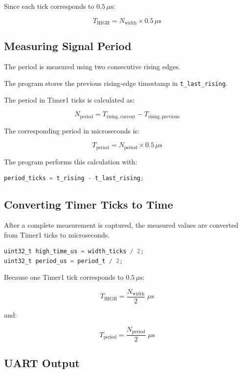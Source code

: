 \documentclass[12pt,a4paper]{article}
\begin{document}
Since each tick corresponds to $0.5\,\mu\mathrm{s}$:

\[
T_{\mathrm{HIGH}}
=
N_{\mathrm{width}}
\times
0.5\,\mu\mathrm{s}
\]

\subsection{Measuring Signal Period}

The period is measured using two consecutive rising edges.

The program stores the previous rising-edge timestamp in
\texttt{t\_last\_rising}.

The period in Timer1 ticks is calculated as:

\[
N_{\mathrm{period}}
=
T_{\mathrm{rising,current}}
-
T_{\mathrm{rising,previous}}
\]

The corresponding period in microseconds is:

\[
T_{\mathrm{period}}
=
N_{\mathrm{period}}
\times
0.5\,\mu\mathrm{s}
\]

The program performs this calculation with:

\begin{lstlisting}[language=C]
period_ticks = t_rising - t_last_rising;
\end{lstlisting}

\subsection{Converting Timer Ticks to Time}

After a complete measurement is captured, the measured values are
converted from Timer1 ticks to microseconds.

\begin{lstlisting}[language=C]
uint32_t high_time_us = width_ticks / 2;
uint32_t period_us = period_t / 2;
\end{lstlisting}

Because one Timer1 tick corresponds to $0.5\,\mu\mathrm{s}$:

\[
T_{\mathrm{HIGH}}
=
\frac{N_{\mathrm{width}}}{2}
\;\mu\mathrm{s}
\]

and:

\[
T_{\mathrm{period}}
=
\frac{N_{\mathrm{period}}}{2}
\;\mu\mathrm{s}
\]

\subsection{UART Output}
\end{document}
